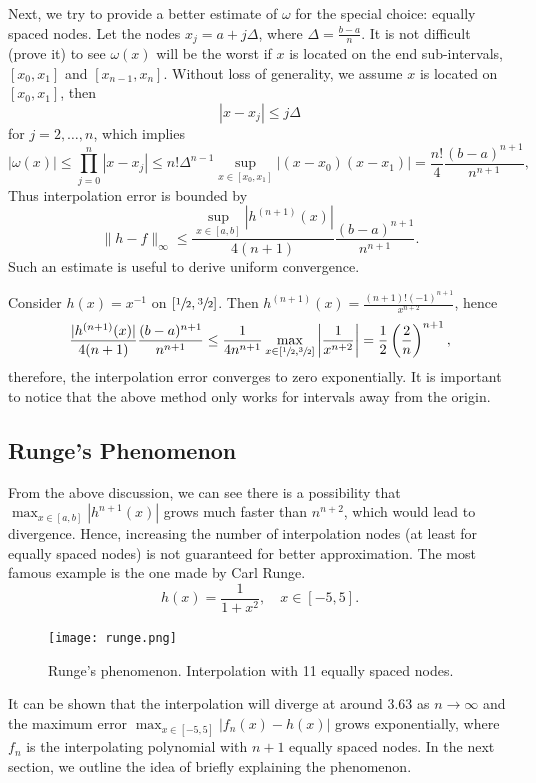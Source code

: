 Next, we try to provide a better estimate of $\omega$ for the special choice: equally spaced nodes.  Let the nodes $x_j = a + j\Delta$, where $\Delta = \frac{b-a}{n}$. It is not difficult (prove it) to see $\omega(x)$ will be the worst if $x$ is located on the end sub-intervals, $[x_0, x_1]$ and $[x_{n-1}, x_n]$. Without loss of generality, we assume $x$ is located on $[x_0, x_1]$, then 
$$|x - x_j|\le j \Delta$$
for $j = 2, \dots, n$, which implies 
\begin{equation}
\label{EQ: MAX-OMEGA}
    |\omega(x)|\le \prod_{j=0}^n |x - x_j|\le n! \Delta^{n-1} \sup_{x\in [x_0, x_1]} |(x - x_0)(x-x_1)|= \frac{n!}{4} \frac{(b-a)^{n+1}}{n^{n+1}},
\end{equation}
Thus interpolation error is bounded by
$$  \|h  - f\|_{\infty} \le  \frac{\sup_{x\in[a,b]}|h^{(n+1)}(x)|}{4(n+1)} \frac{(b-a)^{n+1}}{n^{n+1}}.$$
Such an estimate is useful to derive uniform convergence. 
\begin{example}
    Consider $h(x) = x^{-1}$ on $[\sfrac{1}{2}, \sfrac{3}{2}]$. Then $h^{(n+1)}(x) = \frac{(n+1)!(-1)^{n+1}}{x^{n+2}}$, hence 
    \begin{equation}
        \frac{| h^{(n+1)}(x) |}{4(n+1)}  \frac{(b-a)^{n+1}}{n^{n+1}} \le \frac{1}{4n^{n+1}}\max_{x\in[\sfrac{1}{2}, \sfrac{3}{2}]} \left| \frac{1}{x^{n+2}} \right| = \frac{1}{2} \left(\frac{2}{n}\right)^{n+1},
    \end{equation}
    therefore, the interpolation error converges to zero exponentially. It is important to notice that the above method only works for intervals away from the origin. 
\end{example} 

\subsection{Runge's Phenomenon}
\label{SSec: 2-Run-Phe}
From the above discussion, we can see there is a possibility that $\max_{x\in[a,b]}|h^{n+1}(x)|$ grows much faster than $n^{n+2}$, which would lead to divergence. Hence, increasing the number of interpolation nodes (at least for equally spaced nodes) is not guaranteed for better approximation. The most famous example is the one made by Carl Runge. 
\begin{equation}
\label{EQ: RUNGE-EXAMPLE}
    h(x) = \frac{1}{1+x^2},\quad x\in [-5, 5].
\end{equation} 
\begin{figure}[!htb]
    \centering
    \texttt{[image: runge.png]}
    \caption{Runge's phenomenon. Interpolation with 11 equally spaced nodes. }
\end{figure}
It can be shown that the interpolation will diverge at around $3.63$ as $n\to \infty$ and the maximum error $\max_{x\in[-5, 5]} |f_n(x) - h(x) |$ grows exponentially, where $f_n$ is the interpolating polynomial with $n+1$ equally spaced nodes. In the next section, we outline the idea of briefly explaining the phenomenon. 
